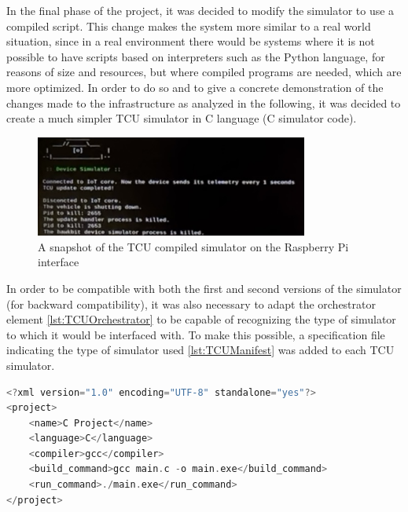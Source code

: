 In the final phase of the project, it was decided to modify the simulator to use a compiled script. This change makes the system more similar to a real world situation, since in a real environment there would be systems where it is not possible to have scripts based on interpreters such as the Python language, for reasons of size and resources, but where compiled programs are needed, which are more optimized. In order to do so and to give a concrete demonstration of the changes made to the infrastructure as analyzed in the following, it was decided to create a much simpler TCU simulator in C language (C simulator code). 
\begin{figure}[h]  %
    \centering
    \includegraphics[width=0.8\textwidth]{images/TCUsimulatorC.png}  %
    \caption{A snapshot of the TCU compiled simulator on the Raspberry Pi interface}
    \label{fig:TCUsimulatorC}
\end{figure}

In order to be compatible with both the first and second versions of the simulator (for backward compatibility), it was also necessary to adapt the orchestrator element \ref{lst:TCUOrchestrator} to be capable of recognizing the type of simulator to which it would be interfaced with. To make this possible, a specification file indicating the type of simulator used \ref{lst:TCUManifest} was added to each TCU simulator.
\begin{lstlisting}[language=c, caption={Manifest example of compiled TCU simulator}, label=lst:TCUManifest]
<?xml version="1.0" encoding="UTF-8" standalone="yes"?>
<project>
    <name>C Project</name>
    <language>C</language>
    <compiler>gcc</compiler>
    <build_command>gcc main.c -o main.exe</build_command>
    <run_command>./main.exe</run_command>
</project>
\end{lstlisting}

